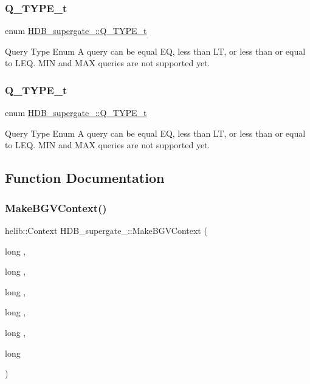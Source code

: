 \subsubsection{\texorpdfstring{Q\+\_\+\+T\+Y\+P\+E\+\_\+t}{Q\_TYPE\_t}\hspace{0.1cm}{\footnotesize\ttfamily [1/2]}}
{\footnotesize\ttfamily enum \hyperlink{namespaceHDB__supergate___a1d92aed09c83a1692f702cbaa85757e2}{H\+D\+B\+\_\+supergate\+\_\+\+::\+Q\+\_\+\+T\+Y\+P\+E\+\_\+t}}

Query Type Enum A query can be equal EQ, less than LT, or less than or equal to L\+EQ. M\+IN and M\+AX queries are not supported yet. \mbox{\label{namespaceHDB__supergate___a1d92aed09c83a1692f702cbaa85757e2}} 
\subsubsection{\texorpdfstring{Q\+\_\+\+T\+Y\+P\+E\+\_\+t}{Q\_TYPE\_t}\hspace{0.1cm}{\footnotesize\ttfamily [2/2]}}
{\footnotesize\ttfamily enum \hyperlink{namespaceHDB__supergate___a1d92aed09c83a1692f702cbaa85757e2}{H\+D\+B\+\_\+supergate\+\_\+\+::\+Q\+\_\+\+T\+Y\+P\+E\+\_\+t}}

Query Type Enum A query can be equal EQ, less than LT, or less than or equal to L\+EQ. M\+IN and M\+AX queries are not supported yet. 

\subsection{Function Documentation}
\mbox{\label{namespaceHDB__supergate___a25f457f93b50fef2dcdb25e044d6cd7c}} 
\subsubsection{\texorpdfstring{Make\+B\+G\+V\+Context()}{MakeBGVContext()}\hspace{0.1cm}{\footnotesize\ttfamily [1/2]}}
{\footnotesize\ttfamily helib\+::\+Context H\+D\+B\+\_\+supergate\+\_\+\+::\+Make\+B\+G\+V\+Context (\begin{DoxyParamCaption}\item[{long}]{,  }\item[{long}]{,  }\item[{long}]{,  }\item[{long}]{,  }\item[{long}]{,  }\item[{long}]{ }\end{DoxyParamCaption})}

